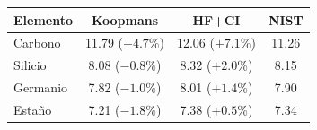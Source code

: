 \begin{tabular}{lccc}
    \toprule
    \textbf{Elemento} & \textbf{Koopmans} & \textbf{HF+CI} & \textbf{NIST} \\
    \midrule
    Carbono & 11.79 ($+4.7$\%) & 12.06 ($+7.1$\%) & 11.26 \\
    Silicio & 8.08 ($-0.8$\%) & 8.32 ($+2.0$\%) & 8.15 \\
    Germanio & 7.82 ($-1.0$\%) & 8.01 ($+1.4$\%) & 7.90 \\
    Estaño & 7.21 ($-1.8$\%) & 7.38 ($+0.5$\%) & 7.34 \\
    \bottomrule
\end{tabular}
